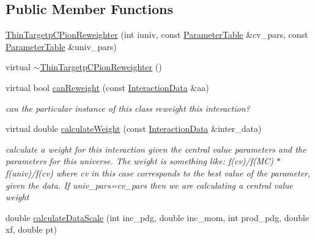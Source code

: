 \subsection*{Public Member Functions}
\begin{DoxyCompactItemize}
\item 
\hyperlink{class_neutrino_flux_reweight_1_1_thin_targetp_c_pion_reweighter_a461135f73ed6cea79b71cc37d17466e2}{Thin\-Targetp\-C\-Pion\-Reweighter} (int iuniv, const \hyperlink{class_neutrino_flux_reweight_1_1_parameter_table}{Parameter\-Table} \&cv\-\_\-pars, const \hyperlink{class_neutrino_flux_reweight_1_1_parameter_table}{Parameter\-Table} \&univ\-\_\-pars)
\item 
virtual \hyperlink{class_neutrino_flux_reweight_1_1_thin_targetp_c_pion_reweighter_a0d76e9167d90e1c56a7291ae6d219fd2}{$\sim$\-Thin\-Targetp\-C\-Pion\-Reweighter} ()
\item 
virtual bool \hyperlink{class_neutrino_flux_reweight_1_1_thin_targetp_c_pion_reweighter_a09067dcacb294ca133e2660d61302e85}{can\-Reweight} (const \hyperlink{class_neutrino_flux_reweight_1_1_interaction_data}{Interaction\-Data} \&aa)
\begin{DoxyCompactList}\small\item\em can the particular instance of this class reweight this interaction? \end{DoxyCompactList}\item 
virtual double \hyperlink{class_neutrino_flux_reweight_1_1_thin_targetp_c_pion_reweighter_ab797bbeeedb04cda73feef891434cd5f}{calculate\-Weight} (const \hyperlink{class_neutrino_flux_reweight_1_1_interaction_data}{Interaction\-Data} \&inter\-\_\-data)
\begin{DoxyCompactList}\small\item\em calculate a weight for this interaction given the central value parameters and the parameters for this universe. The weight is something like\-: f(cv)/f(M\-C) $\ast$ f(univ)/f(cv) where cv in this case corresponds to the best value of the parameter, given the data. If univ\-\_\-pars=cv\-\_\-pars then we are calculating a central value weight \end{DoxyCompactList}\item 
double \hyperlink{class_neutrino_flux_reweight_1_1_thin_targetp_c_pion_reweighter_ac34d175572ca9ac093e973e877891eae}{calculate\-Data\-Scale} (int inc\-\_\-pdg, double inc\-\_\-mom, int prod\-\_\-pdg, double xf, double pt)
\end{DoxyCompactItemize}
